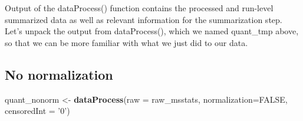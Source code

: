 \documentclass[]{book}
\newenvironment{Shaded}{\begin{snugshade}}{\end{snugshade}}
\newcommand{\DataTypeTok}[1]{\textcolor[rgb]{0.13,0.29,0.53}{#1}}
\newcommand{\KeywordTok}[1]{\textcolor[rgb]{0.13,0.29,0.53}{\textbf{#1}}}
\newcommand{\NormalTok}[1]{#1}
\newcommand{\OtherTok}[1]{\textcolor[rgb]{0.56,0.35,0.01}{#1}}
\newcommand{\StringTok}[1]{\textcolor[rgb]{0.31,0.60,0.02}{#1}}
\begin{document}
Output of the dataProcess() function contains the processed and run-level summarized data as well as relevant information for the summarization step. Let's unpack the output from dataProcess(), which we named quant\_tmp above, so that we can be more familiar with what we just did to our data.

\hypertarget{no-normalization}{%
\subsection{No normalization}\label{no-normalization}}

\begin{Shaded}
\begin{Highlighting}[]
\NormalTok{quant_nonorm <-}\StringTok{ }\KeywordTok{dataProcess}\NormalTok{(}\DataTypeTok{raw =}\NormalTok{ raw_msstats, }
                            \DataTypeTok{normalization=}\OtherTok{FALSE}\NormalTok{,}
                            \DataTypeTok{censoredInt =} \StringTok{'0'}\NormalTok{)}
\end{Highlighting}
\end{Shaded}
\end{document}
